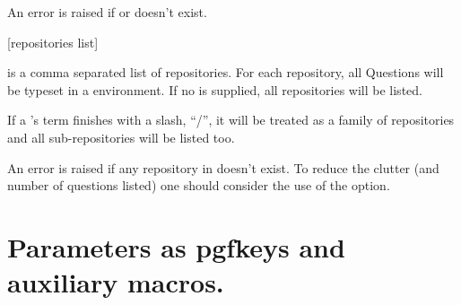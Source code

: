 \documentclass[10pt]{article}
\begin{document}
\begin{tsremark}
An error is raised if  or  doesn't exist.
\end{tsremark}

%

\begin{codedescribe}{\QuestionsList}\label{quest list}
\begin{codesyntax}%
\tsmacro{\QuestionsList}[repositories list]{}
\end{codesyntax}
 is a comma separated list of repositories. For each repository,  all Questions will be typeset in a  environment. If no  is supplied, all repositories will be listed.
\end{codedescribe}

\begin{tsremark}
If a 's term finishes with a slash, ``/'', it will be treated as a family of repositories and all sub-repositories will be listed too.
\end{tsremark}

\begin{tsremark}
An error is raised if any repository in  doesn't exist. To reduce the clutter (and number of questions listed) one should consider the use of the   option.
\end{tsremark}

\section{Parameters as pgfkeys and auxiliary macros.}\label{parameters}
\end{document}
